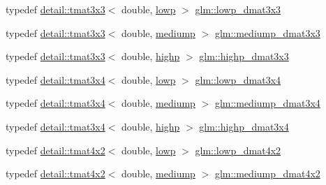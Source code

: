 \begin{DoxyCompactItemize}
typedef \hyperlink{structglm_1_1detail_1_1tmat3x3}{detail\+::tmat3x3}$<$ double, \hyperlink{namespaceglm_a0f04f086094c747d227af4425893f545ae161af3fc695e696ce3bf69f7332bc2d}{lowp} $>$ \hyperlink{group__core__precision_gaea1bc4ede38e1b904f01ff5ce59210ea}{glm\+::lowp\+\_\+dmat3x3}
\item 
typedef \hyperlink{structglm_1_1detail_1_1tmat3x3}{detail\+::tmat3x3}$<$ double, \hyperlink{namespaceglm_a0f04f086094c747d227af4425893f545a6416f3ea0c9025fb21ed50c4d6620482}{mediump} $>$ \hyperlink{group__core__precision_ga2f73508d8192390ca9f9b569f544fade}{glm\+::mediump\+\_\+dmat3x3}
\item 
typedef \hyperlink{structglm_1_1detail_1_1tmat3x3}{detail\+::tmat3x3}$<$ double, \hyperlink{namespaceglm_a0f04f086094c747d227af4425893f545ac6f7eab42eacbb10d59a58e95e362074}{highp} $>$ \hyperlink{group__core__precision_gad7229dea82287910d88e6e8566e39fc7}{glm\+::highp\+\_\+dmat3x3}
\item 
typedef \hyperlink{structglm_1_1detail_1_1tmat3x4}{detail\+::tmat3x4}$<$ double, \hyperlink{namespaceglm_a0f04f086094c747d227af4425893f545ae161af3fc695e696ce3bf69f7332bc2d}{lowp} $>$ \hyperlink{group__core__precision_ga4640e1d20ad705842525e79a4cc57b15}{glm\+::lowp\+\_\+dmat3x4}
\item 
typedef \hyperlink{structglm_1_1detail_1_1tmat3x4}{detail\+::tmat3x4}$<$ double, \hyperlink{namespaceglm_a0f04f086094c747d227af4425893f545a6416f3ea0c9025fb21ed50c4d6620482}{mediump} $>$ \hyperlink{group__core__precision_gaedd814e706701200b13b86fc6fd7b373}{glm\+::mediump\+\_\+dmat3x4}
\item 
typedef \hyperlink{structglm_1_1detail_1_1tmat3x4}{detail\+::tmat3x4}$<$ double, \hyperlink{namespaceglm_a0f04f086094c747d227af4425893f545ac6f7eab42eacbb10d59a58e95e362074}{highp} $>$ \hyperlink{group__core__precision_gaff199c8d04a8edb92ed43283e8694c59}{glm\+::highp\+\_\+dmat3x4}
\item 
typedef \hyperlink{structglm_1_1detail_1_1tmat4x2}{detail\+::tmat4x2}$<$ double, \hyperlink{namespaceglm_a0f04f086094c747d227af4425893f545ae161af3fc695e696ce3bf69f7332bc2d}{lowp} $>$ \hyperlink{group__core__precision_ga28a7ef670069c3707f19b9de1039517e}{glm\+::lowp\+\_\+dmat4x2}
\item 
typedef \hyperlink{structglm_1_1detail_1_1tmat4x2}{detail\+::tmat4x2}$<$ double, \hyperlink{namespaceglm_a0f04f086094c747d227af4425893f545a6416f3ea0c9025fb21ed50c4d6620482}{mediump} $>$ \hyperlink{group__core__precision_ga03056b616496470371473cd5df4dc1f8}{glm\+::mediump\+\_\+dmat4x2}
\item 

\end{DoxyCompactItemize}
